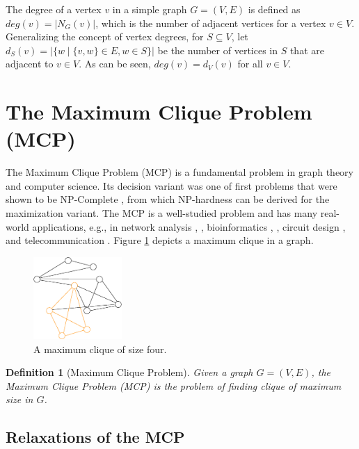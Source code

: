 \documentclass[draft,final]{vutinfth} %
\newtheorem{definition}{Definition}[section]
\begin{document}
The degree of a vertex $v$ in a simple graph $G = (V,E)$ is defined as $\mathit{deg}(v) = |N_G(v)|$, which is the number of adjacent vertices for a vertex $v \in V$. Generalizing the concept of vertex degrees, for $S \subseteq V$, let $d_S(v) = |\{w \mid \{v,w\} \in E, w \in S\}|$ be the number of vertices in $S$ that are adjacent to $v \in V$. As can be seen, $\mathit{deg}(v) = d_V(v) $ for all $v \in V$. 


\section{The Maximum Clique Problem (MCP)}\label{sec:mcp}

The Maximum Clique Problem (MCP) is a fundamental problem in graph theory and computer science. Its decision variant was one of first problems that were shown to be NP-Complete \cite{Karp1972}, from which NP-hardness can be derived for the maximization variant. The MCP is a well-studied problem and has many real-world applications, e.g., in network analysis \cite{Fortunato09}, \cite{Palla2005}, bioinformatics \cite{Depolli2013}, \cite{BUTENKO20061}, circuit design \cite{LeckyMA89}, and telecommunication \cite{DouikSAA14}. 
Figure \ref{fig:maxclique} depicts a maximum clique in a graph. 
\begin{figure}
    \centering
    \includegraphics[width=0.3\textwidth]{graphics/graph1-clique.eps}
    \caption{A maximum clique of size four.}
    \label{fig:maxclique}
\end{figure}

\begin{definition}[Maximum Clique Problem]
	\label{def:mcp}
	Given a graph $G = (V,E)$, the Maximum Clique Problem (MCP) is the problem of finding clique of maximum size in $G$. 
\end{definition}

\subsection{Relaxations of the MCP}
\end{document}
